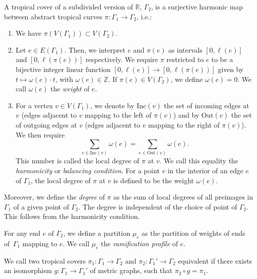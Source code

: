 \begin{defi}
A tropical cover of a subdivided version of $\mathbb{R}$, $\Gamma_2$, is a surjective harmonic map between abstract tropical curves $\pi\colon \Gamma_1\to\Gamma_2$, i.e.:
\begin{enumerate}
    \item We have $\pi(V(\Gamma_1))\subset V(\Gamma_2)$.
    \item Let $e\in E(\Gamma_1)$. Then, we interpret $e$ and $\pi(e)$ as intervals $[0,\ell(e)]$ and $[0,\ell(\pi(e))]$ respectively. We require $\pi$ restricted to $e$ to be a bijective integer linear function $[0,\ell(e)]\to[0,\ell(\pi(e))]$ given by $t\mapsto \omega(e)\cdot t$, with $\omega(e) \in \mathbb{Z}$. If $\pi(e)\in V(\Gamma_2)$, we define $\omega(e)=0$. We call $\omega(e)$ the \textit{weight} of $e$.
    \item For a vertex $v\in V(\Gamma_1)$, we denote by $\mathrm{Inc}(v)$ the set of incoming edges at $v$ (edges adjacent to $v$ mapping to the left of $\pi(v)$) and by $\mathrm{Out}(v)$ the set of outgoing edges at $v$ (edges adjacent to $v$ mapping to the right of $\pi(v)$). We then require
    \begin{equation*}
            \sum_{e\in\mathrm{Inc}(v)}\omega(e)=\sum_{e\in\mathrm{Out}(v)}\omega(e).
    \end{equation*}
    This number is called the local degree of $\pi$ at $v$.
    We call this equality the \textit{harmonicity} or \textit{balancing condition}.
    For a point $v$ in the interior of an edge $e$ of $\Gamma_1$, the local degree of $\pi$ at $v$ is defined to be the weight $\omega(e)$.
\end{enumerate}
Moreover, we define the \textit{degree} of $\pi$ as the sum of local degrees of all preimages in $\Gamma_1$ of a given point of $\Gamma_2$. The degree is independent of the choice of point of $\Gamma_2$. This follows from the harmonicity condition.

For any end $e$ of $\Gamma_2$, we define a partition $\mu_e$ as the partition of weights of ends of~$\Gamma_1$ mapping to $e$. We call $\mu_e$ the \textit{ramification profile} of $e$.

We call two tropical covers $\pi_1\colon\Gamma_1\to\Gamma_2$ and $\pi_2\colon\Gamma_1'\to\Gamma_2$ equivalent if there exists an isomorphism $g\colon\Gamma_1\to\Gamma_1'$ of metric graphs, such that $\pi_2\circ g=\pi_1$.
\end{defi}

